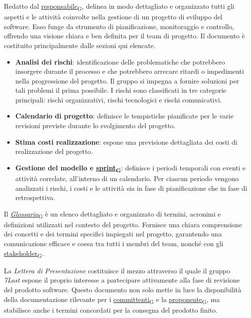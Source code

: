 Redatto dal \href{https://7last.github.io/docs/rtb/documentazione-interna/glossario\#responsabile}{responsabile\textsubscript{G}}, delinea in modo dettagliato e organizzato tutti gli aspetti e le attività coinvolte nella gestione di un progetto di sviluppo del software. Esso funge da strumento di pianificazione, monitoraggio e controllo, offrendo una visione chiara e ben definita per il team di progetto. Il documento è costituito principalmente dalle sezioni qui elencate.
\begin{itemize}
	\item \textbf{Analisi dei rischi}: identificazione delle problematiche che potrebbero insorgere durante il processo e che potrebbero arrecare ritardi o impedimenti nella progressione del progetto. Il gruppo si impegna a fornire soluzioni per tali problemi il prima possibile. I rischi sono classificati in tre categorie principali: rischi organizzativi, rischi tecnologici e rischi comunicativi.
	\item \textbf{Calendario di progetto}: definisce le tempistiche pianificate per le varie revisioni previste durante lo svolgimento del progetto.
	\item \textbf{Stima costi realizzazione}: espone una previsione dettagliata dei costi di realizzazione del progetto.
	\item \textbf{Gestione del modello e \href{https://7last.github.io/docs/rtb/documentazione-interna/glossario\#sprint}{sprint\textsubscript{G}}}: definisce i periodi temporali con eventi e attività correlate, all'interno di un calendario. Per ciascun periodo vengono analizzati i rischi, i costi e le attività sia in fase di pianificazione che in fase di retrospettiva.
\end{itemize}


Il \href{https://7last.github.io/docs/rtb/documentazione-interna/glossario\#glossario}{\textit{Glossario}\textsubscript{G}} è un elenco dettagliato e organizzato di termini, acronimi e definizioni utilizzati nel contesto del progetto. Fornisce una chiara comprensione dei concetti e dei termini specifici impiegati nel progetto, garantendo una comunicazione efficace e coesa tra tutti i membri del team, nonché con gli \href{https://7last.github.io/docs/rtb/documentazione-interna/glossario\#stakeholder}{stakeholder\textsubscript{G}}.

La \textit{Lettera di Presentazione} costituisce il mezzo attraverso il quale il gruppo \textit{7Last} espone il proprio interesse a partecipare attivamente alla fase di revisione del prodotto software. Questo documento non solo mette in luce la disponibilità della documentazione rilevante per i \href{https://7last.github.io/docs/rtb/documentazione-interna/glossario\#committente}{committenti\textsubscript{G}} e la \href{https://7last.github.io/docs/rtb/documentazione-interna/glossario\#proponente}{proponente\textsubscript{G}}, ma stabilisce anche i termini concordati per la consegna del prodotto finito.

